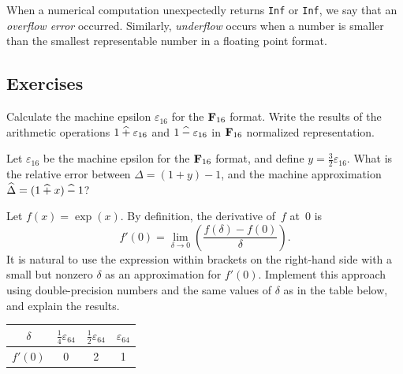 When a numerical computation unexpectedly returns \texttt{Inf} or \texttt{Inf},
we say that an \emph{overflow error} occurred.
Similarly, \emph{underflow} occurs when a number
is smaller than the smallest representable number in a floating point format.

\subsection{Exercises}%
\label{sub:exercises}


\begin{exercise}
    Calculate the machine epsilon $\varepsilon_{16}$ for the $\mathbf F_{16}$ format.
    Write the results of the arithmetic operations $1 \mathbin{\widehat +} \varepsilon_{16}$ and $1 \mathbin{\widehat -} \varepsilon_{16}$ in $\mathbf F_{16}$ normalized representation.
\end{exercise}

\begin{exercise}
    Let $\varepsilon_{16}$ be the machine epsilon for the $\mathbf F_{16}$ format,
    and define $y = \frac{3}{2} \varepsilon_{16}$.
    What is the relative error between $\Delta = (1 + y) - 1$,
    and the machine approximation $\widehat \Delta = (1 \mathbin{\widehat +} x) \mathbin{\widehat -} 1$?
\end{exercise}

\begin{exercise}
    Let $f(x) = \exp(x)$.
    By definition, the derivative of~$f$ at~$0$ is
    \[
        f'(0) = \lim_{\delta \to 0} \left( \frac{f(\delta) - f(0)}{\delta} \right).
    \]
    It is natural to use the expression within brackets on the right-hand side
    with a small but nonzero $\delta$ as an approximation for $f'(0)$.
    Implement this approach using double-precision numbers and the same values of $\delta$ as in the table below,
    and explain the results.
    \begin{center}
        \begin{tabular}{c|c|c|c}
            $\delta$ & $\frac{1}{4} \varepsilon_{64}$ & $\frac{1}{2} \varepsilon_{64}$ & $\varepsilon_{64}$ \\
            \hline
            $f'(0)$ & 0 & 2 & 1
        \end{tabular}
    \end{center}
\end{exercise}

